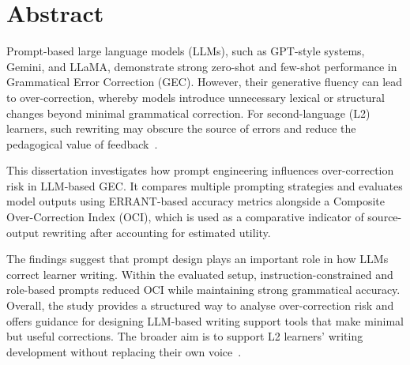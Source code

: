 \chapter*{\Large \center Abstract}

Prompt-based large language models (LLMs), such as GPT-style systems, Gemini, and LLaMA, demonstrate strong zero-shot and few-shot performance in Grammatical Error Correction (GEC). However, their generative fluency can lead to over-correction, whereby models introduce unnecessary lexical or structural changes beyond minimal grammatical correction. For second-language (L2) learners, such rewriting may obscure the source of errors and reduce the pedagogical value of feedback~\cite{loem2023exploringeffectivenessgpt3grammatical}.

This dissertation investigates how prompt engineering influences over-correction risk in LLM-based GEC. It compares multiple prompting strategies and evaluates model outputs using ERRANT-based accuracy metrics alongside a Composite Over-Correction Index (OCI), which is used as a comparative indicator of source-output rewriting after accounting for estimated utility.

The findings suggest that prompt design plays an important role in how LLMs correct learner writing. Within the evaluated setup, instruction-constrained and role-based prompts reduced OCI while maintaining strong grammatical accuracy. Overall, the study provides a structured way to analyse over-correction risk and offers guidance for designing LLM-based writing support tools that make minimal but useful corrections. The broader aim is to support L2 learners' writing development without replacing their own voice~\cite{park-etal-2025-leveraging}.
